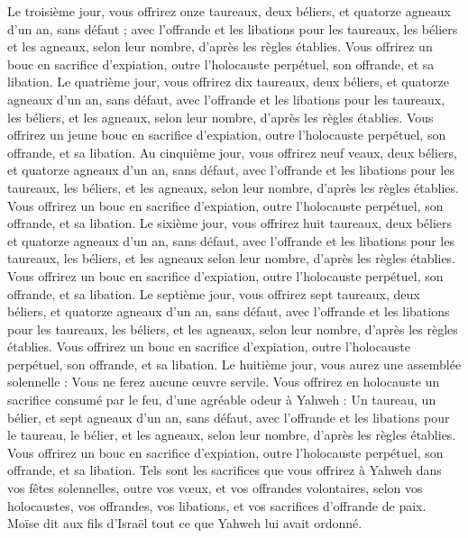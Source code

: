 \begin{multicols}{2}
Le troisième jour, vous offrirez onze taureaux, deux béliers, et quatorze agneaux d'un an, sans défaut ;
avec l’offrande et les libations pour les taureaux, les béliers et les agneaux, selon leur nombre, d’après les règles établies.
Vous offrirez un bouc en sacrifice d’expiation, outre l'holocauste perpétuel, son offrande, et sa libation.
Le quatrième jour, vous offrirez dix taureaux, deux béliers, et quatorze agneaux d'un an, sans défaut,
avec l’offrande et les libations pour les taureaux, les béliers, et les agneaux, selon leur nombre, d’après les règles établies.
Vous offrirez un jeune bouc en sacrifice d’expiation, outre l'holocauste perpétuel, son offrande, et sa libation.
Au cinquième jour, vous offrirez neuf veaux, deux béliers, et quatorze agneaux d'un an, sans défaut,
avec l’offrande et les libations pour les taureaux, les béliers, et les agneaux, selon leur nombre, d’après les règles établies.
Vous offrirez un bouc en sacrifice d’expiation, outre l'holocauste perpétuel, son offrande, et sa libation.
Le sixième jour, vous offrirez huit taureaux, deux béliers et quatorze agneaux d'un an, sans défaut,
avec l’offrande et les libations pour les taureaux, les béliers, et les agneaux selon leur nombre, d’après les règles établies.
Vous offrirez un bouc en sacrifice d’expiation, outre l'holocauste perpétuel, son offrande, et sa libation.
Le septième jour, vous offrirez sept taureaux, deux béliers, et quatorze agneaux d'un an, sans défaut,
avec l’offrande et les libations pour les taureaux, les béliers, et les agneaux, selon leur nombre, d’après les règles établies.
Vous offrirez un bouc en sacrifice d’expiation, outre l'holocauste perpétuel, son offrande, et sa libation.
Le huitième jour, vous aurez une assemblée solennelle : Vous ne ferez aucune œuvre servile.
Vous offrirez en holocauste un sacrifice consumé par le feu, d’une agréable odeur à Yahweh : Un taureau, un bélier, et sept agneaux d'un an, sans défaut,
avec l’offrande et les libations pour le taureau, le bélier, et les agneaux, selon leur nombre, d’après les règles établies.
Vous offrirez un bouc en sacrifice d’expiation, outre l'holocauste perpétuel, son offrande, et sa libation.
Tels sont les sacrifices que vous offrirez à Yahweh dans vos fêtes solennelles, outre vos vœux, et vos offrandes volontaires, selon vos holocaustes, vos offrandes, vos libations, et vos sacrifices d’offrande de paix.
\VerseOne{}Moïse dit aux fils d’Israël tout ce que Yahweh lui avait ordonné.

\end{multicols}
